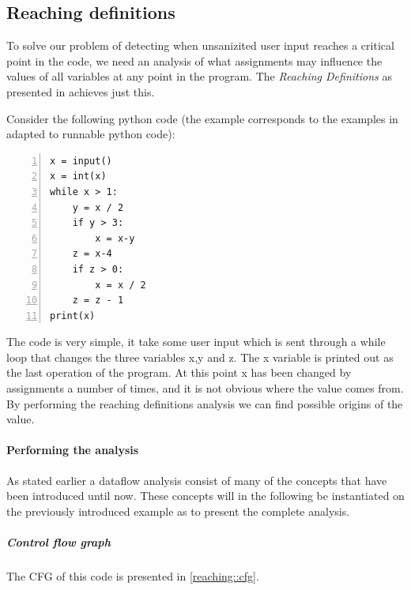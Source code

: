 \subsection{Reaching definitions}
To solve our problem of detecting when unsanizited user input reaches a critical point in the code, we need an analysis of what assignments may influence the values of all variables at any point in the program.
The \emph{Reaching Definitions} as presented in \citet[p.~26]{schwartzbach} achieves just this.

Consider the following python code (the example corresponds to the examples in \citet{schwartzbach} adapted to runnable python code):
\begin{lstlisting}[numbers=left, frame=single, linewidth=6cm]
x = input()
x = int(x)
while x > 1:
    y = x / 2
    if y > 3:
        x = x-y
    z = x-4
    if z > 0:
        x = x / 2
    z = z - 1
print(x)
\end{lstlisting}

The code is very simple, it take some user input which is sent through a while loop that changes the three variables x,y and z.
The x variable is printed out as the last operation of the program.
At this point x has been changed by assignments a number of times, and it is not obvious where the value comes from.
By performing the reaching definitions analysis we can find possible origins of the value.

\paragraph{Performing the analysis}
As stated earlier a dataflow analysis consist of many of the concepts that have been introduced until now.
These concepts will in the following be instantiated on the previously introduced example as to present the complete analysis.

\subparagraph{Control flow graph}
The CFG of this code is presented in \cref{reaching::cfg}.

